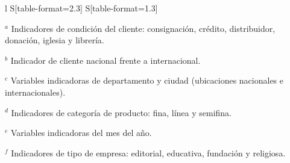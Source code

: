 \begin{table}[ht]
\begin{threeparttable}
\begin{tabular}{
    l
    S[table-format=2.3]
    S[table-format=1.3]
    }
    \bottomrule
    \end{tabular}
    
    \begin{tablenotes}[flushleft]
    \footnotesize
    \item $^{a}$ Indicadores de condición del cliente: consignación, crédito, distribuidor, donación, iglesia y librería.
    \item $^{b}$ Indicador de cliente nacional frente a internacional.
    \item $^{c}$ Variables indicadoras de departamento y ciudad (ubicaciones nacionales e internacionales).
    \item $^{d}$ Indicadores de categoría de producto: fina, línea y semifina.
    \item $^{e}$ Variables indicadoras del mes del año.
    \item $^{f}$ Indicadores de tipo de empresa: editorial, educativa, fundación y religiosa.
    \end{tablenotes}
    
    \end{threeparttable}
\end{table}


